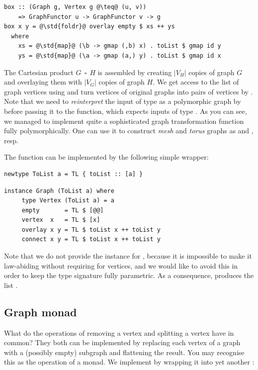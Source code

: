 \begin{verbatim}
box :: (Graph g, Vertex g @\teq@ (u, v))
    => GraphFunctor u -> GraphFunctor v -> g
box x y = @\std{foldr}@ overlay empty $ xs ++ ys
  where
    xs = @\std{map}@ (\b -> gmap (,b) x) . toList $ gmap id y
    ys = @\std{map}@ (\a -> gmap (a,) y) . toList $ gmap id x
\end{verbatim}

The Cartesian product $G~~\square~~H$ is assembled by creating $|V_H|$ copies
of graph $G$ and overlaying them with $|V_G|$ copies of graph $H$. We get
access to the list of graph vertices using  and turn vertices of
original graphs into pairs of vertices by . Note that we need to
\emph{reinterpret} the input of type  as a polymorphic graph
by  before passing it to the  function, which expects
inputs of type . As you can see, we managed to implement quite
a sophisticated graph transformation function  fully polymorphically.
One can use it to construct \emph{mesh} and \emph{torus} graphs as
 and
, resp.

The  function can be implemented by the following simple 
wrapper:

\begin{verbatim}
newtype ToList a = TL { toList :: [a] }
\end{verbatim}
\vspace{1mm}
\begin{verbatim}
instance Graph (ToList a) where
     type Vertex (ToList a) = a
     empty       = TL $ [@@]
     vertex  x   = TL $ [x]
     overlay x y = TL $ toList x ++ toList y
     connect x y = TL $ toList x ++ toList y
\end{verbatim}

\noindent
Note that we do not provide the  instance for , because it
is impossible to make it law-abiding without requiring  for vertices,
and we would like to avoid this in order to keep the  type signature
fully parametric. As a consequence,  produces the
list \hs{[1,1]}.

\subsection{Graph monad}\label{sub-monad}

What do the operations of removing a vertex and splitting a vertex have in common?
They both can be implemented by replacing each vertex of a graph with a (possibly empty)
subgraph and flattening the result. You may recognise this as the  operation
of a monad. We implement  by wrapping it into yet another :

